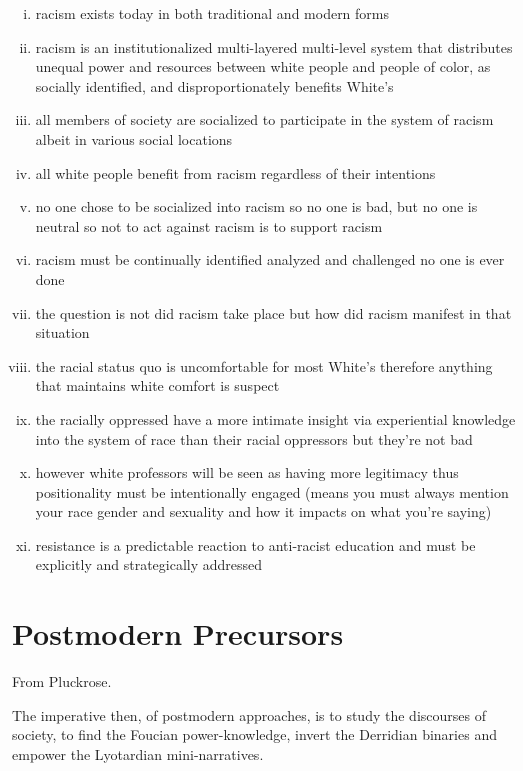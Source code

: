 \documentclass[10pt,titlepage]{book}
\begin{document}
\begin{enumerate}[i)]
\item  racism exists today in both traditional and modern forms
\item  racism is an institutionalized multi-layered multi-level system that distributes unequal power and resources between white people and people of color, as socially identified, and disproportionately benefits White's
\item  all members of society are socialized to participate in the system of racism albeit in various social locations
\item all white people benefit from racism regardless of their intentions
\item no one chose to be socialized into racism so no one is bad, but no one is neutral so not to act against racism is to support racism
\item racism must be continually identified analyzed and challenged no one is ever done
\item the question is not did racism take place but how did racism manifest in that situation
\item the racial status quo is uncomfortable for most White's therefore anything that maintains white comfort is suspect
\item the racially oppressed have a more intimate insight via experiential knowledge into the system of race than their racial oppressors but they're not bad
  \item however white professors will be seen as having more legitimacy thus positionality must be intentionally engaged (means you must always mention your race gender and sexuality and how it impacts on what you're saying)
\item resistance is a predictable reaction to anti-racist education and must be explicitly and strategically addressed
\end{enumerate}

\section{Postmodern Precursors}

From Pluckrose\cite{pluckrose-evolution}.


The imperative then, of postmodern approaches, is to study the discourses of society, to find the Foucian power-knowledge, invert the Derridian binaries and empower the Lyotardian mini-narratives.
\end{document}
